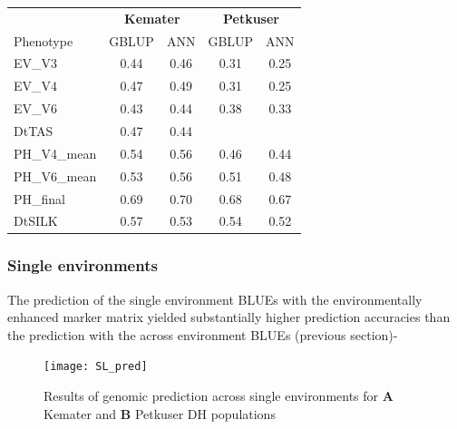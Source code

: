 \onehalfspacing
\begin{table}[H]
\centering
\begin{tabular}{lcc|cc}
 \toprule
 & \multicolumn{2}{c}{\textbf{Kemater}} & \multicolumn{2}{c}{\textbf{Petkuser}} \\
 Phenotype & GBLUP & ANN & GBLUP & ANN \\ 
 \midrule
 EV\_V3 & 0.44 & 0.46 & 0.31 & 0.25 \\ 
 EV\_V4 & 0.47 & 0.49 & 0.31 & 0.25 \\ 
 EV\_V6 & 0.43 & 0.44 & 0.38 & 0.33 \\ 
 DtTAS & 0.47 & 0.44 & & \\ 
 PH\_V4\_mean & 0.54 & 0.56 & 0.46 & 0.44 \\ 
 PH\_V6\_mean & 0.53 & 0.56 & 0.51 & 0.48 \\ 
 PH\_final & 0.69 & 0.70 & 0.68 & 0.67 \\ 
 DtSILK & 0.57 & 0.53 & 0.54 & 0.52 \\ 
 \bottomrule
\end{tabular}
\end{table}
\doublespacing

\subsubsection{Single environments}

The prediction of the single environment BLUEs with the environmentally enhanced marker matrix yielded
substantially higher prediction accuracies than the prediction with the across environment BLUEs (previous section)-

\begin{figure}[H]
 \centering \texttt{[image: SL\_pred]}
 \decoRule
 \caption[Results of genomic prediction across single environments for Kemater and Petkuser DH populations]{Results of genomic prediction across single environments for \textbf{A} Kemater and \textbf{B} Petkuser DH populations}
\label{fig:sl_pred}
\end{figure}

